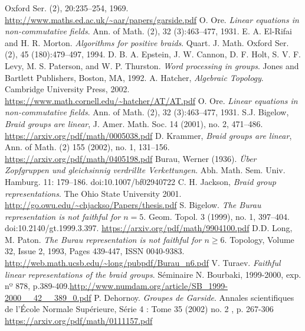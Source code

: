 \documentclass[TFG.tex]{subfiles}
\begin{document}
\begin{thebibliography}{}
Oxford Ser. (2), 20:235–254, 1969. \url{http://www.maths.ed.ac.uk/~aar/papers/garside.pdf}
 O. Ore. \emph{Linear equations in non-commutative fields}. Ann. of Math.
(2), 32 (3):463–477, 1931.
E. A. El-Rifai and H. R. Morton. \emph{Algorithms for positive braids}.
Quart. J. Math. Oxford Ser. (2), 45 (180):479–497, 1994.
 D. B. A. Epstein, J. W. Cannon, D. F. Holt, S. V. F. Levy, M. S.
Paterson, and W. P. Thurston. \emph{Word processing in groups}. Jones and
Bartlett Publishers, Boston, MA, 1992.
 A. Hatcher, \emph{Algebraic Topology}. Cambridge University Press, 2002. \url{https://www.math.cornell.edu/~hatcher/AT/AT.pdf}
 O. Ore. \emph{Linear equations in non-commutative fields}. Ann. of Math.
(2), 32 (3):463–477, 1931.
 S.J. Bigelow, \emph{Braid groups are linear}, J. Amer. Math. Soc. 14 (2001), no. 2,
471–486. \url{https://arxiv.org/pdf/math/0005038.pdf}
 D. Krammer, \emph{Braid groups are linear}, Ann. of Math. (2) 155 (2002), no. 1,
131–156. \url{https://arxiv.org/pdf/math/0405198.pdf}
 Burau, Werner (1936). \emph{Über Zopfgruppen und gleichsinnig verdrillte Verkettungen}. Abh. Math. Sem. Univ. Hamburg. 11: 179–186. doi:10.1007/bf02940722
 C. H. Jackson, \emph{Braid group representations}. The Ohio State University
2001. \url{http://go.owu.edu/~chjackso/Papers/thesis.pdf}
 S. Bigelow. \emph{The Burau representation is not faithful for $n = 5$}. Geom. Topol. 3 (1999), no. 1, 397--404. doi:10.2140/gt.1999.3.397. 
\url{https://arxiv.org/pdf/math/9904100.pdf}
D.D. Long, M. Paton.
\emph{The Burau representation is not faithful for $n ≥ 6$}.
Topology,
Volume 32, Issue 2,
1993,
Pages 439-447,
ISSN 0040-9383. \url{http://web.math.ucsb.edu/~long/pubpdf/Burau_n6.pdf}
 V. Turaev. \emph{Faithful linear representations of the braid groups}. Séminaire N. Bourbaki, 1999-2000, exp. nº 878, p.389-409.\url{http://www.numdam.org/article/SB_1999-2000__42__389_0.pdf}
 P. Dehornoy. \emph{Groupes de Garside}. Annales scientifiques de l'École Normale Supérieure, Série 4 : Tome 35 (2002) no. 2 , p. 267-306 \url{https://arxiv.org/pdf/math/0111157.pdf}
\end{thebibliography}
\end{document}
